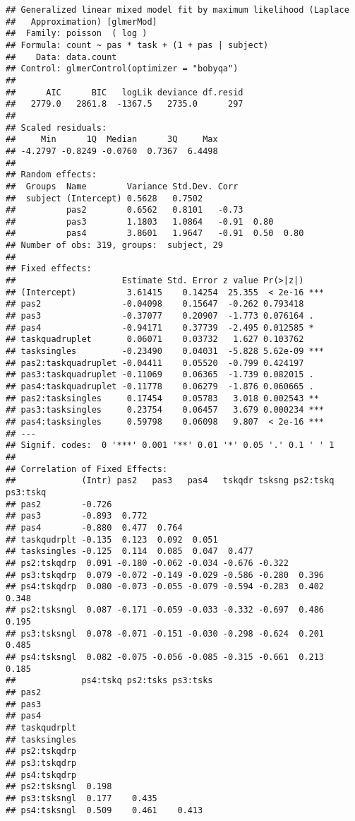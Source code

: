 \documentclass[
]{article}
\begin{document}
\begin{verbatim}
## Generalized linear mixed model fit by maximum likelihood (Laplace
##   Approximation) [glmerMod]
##  Family: poisson  ( log )
## Formula: count ~ pas * task + (1 + pas | subject)
##    Data: data.count
## Control: glmerControl(optimizer = "bobyqa")
## 
##      AIC      BIC   logLik deviance df.resid 
##   2779.0   2861.8  -1367.5   2735.0      297 
## 
## Scaled residuals: 
##     Min      1Q  Median      3Q     Max 
## -4.2797 -0.8249 -0.0760  0.7367  6.4498 
## 
## Random effects:
##  Groups  Name        Variance Std.Dev. Corr             
##  subject (Intercept) 0.5628   0.7502                    
##          pas2        0.6562   0.8101   -0.73            
##          pas3        1.1803   1.0864   -0.91  0.80      
##          pas4        3.8601   1.9647   -0.91  0.50  0.80
## Number of obs: 319, groups:  subject, 29
## 
## Fixed effects:
##                     Estimate Std. Error z value Pr(>|z|)    
## (Intercept)          3.61415    0.14254  25.355  < 2e-16 ***
## pas2                -0.04098    0.15647  -0.262 0.793418    
## pas3                -0.37077    0.20907  -1.773 0.076164 .  
## pas4                -0.94171    0.37739  -2.495 0.012585 *  
## taskquadruplet       0.06071    0.03732   1.627 0.103762    
## tasksingles         -0.23490    0.04031  -5.828 5.62e-09 ***
## pas2:taskquadruplet -0.04411    0.05520  -0.799 0.424197    
## pas3:taskquadruplet -0.11069    0.06365  -1.739 0.082015 .  
## pas4:taskquadruplet -0.11778    0.06279  -1.876 0.060665 .  
## pas2:tasksingles     0.17454    0.05783   3.018 0.002543 ** 
## pas3:tasksingles     0.23754    0.06457   3.679 0.000234 ***
## pas4:tasksingles     0.59798    0.06098   9.807  < 2e-16 ***
## ---
## Signif. codes:  0 '***' 0.001 '**' 0.01 '*' 0.05 '.' 0.1 ' ' 1
## 
## Correlation of Fixed Effects:
##             (Intr) pas2   pas3   pas4   tskqdr tsksng ps2:tskq ps3:tskq
## pas2        -0.726                                                     
## pas3        -0.893  0.772                                              
## pas4        -0.880  0.477  0.764                                       
## taskqudrplt -0.135  0.123  0.092  0.051                                
## tasksingles -0.125  0.114  0.085  0.047  0.477                         
## ps2:tskqdrp  0.091 -0.180 -0.062 -0.034 -0.676 -0.322                  
## ps3:tskqdrp  0.079 -0.072 -0.149 -0.029 -0.586 -0.280  0.396           
## ps4:tskqdrp  0.080 -0.073 -0.055 -0.079 -0.594 -0.283  0.402    0.348  
## ps2:tsksngl  0.087 -0.171 -0.059 -0.033 -0.332 -0.697  0.486    0.195  
## ps3:tsksngl  0.078 -0.071 -0.151 -0.030 -0.298 -0.624  0.201    0.485  
## ps4:tsksngl  0.082 -0.075 -0.056 -0.085 -0.315 -0.661  0.213    0.185  
##             ps4:tskq ps2:tsks ps3:tsks
## pas2                                  
## pas3                                  
## pas4                                  
## taskqudrplt                           
## tasksingles                           
## ps2:tskqdrp                           
## ps3:tskqdrp                           
## ps4:tskqdrp                           
## ps2:tsksngl  0.198                    
## ps3:tsksngl  0.177    0.435           
## ps4:tsksngl  0.509    0.461    0.413
\end{verbatim}
\end{document}
